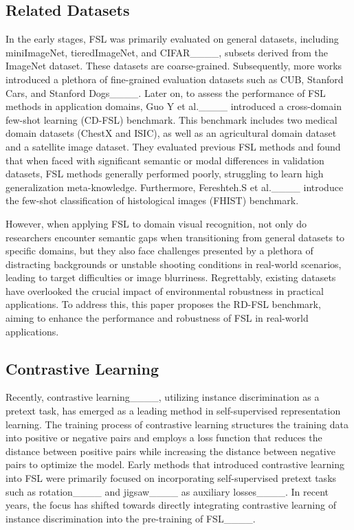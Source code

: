 \subsection{Related Datasets}
\label{subsec:related}
In the early stages, FSL was primarily evaluated on general datasets, including miniImageNet, tieredImageNet, and CIFAR____, subsets derived from the ImageNet dataset. These datasets are coarse-grained. Subsequently, more works introduced a plethora of fine-grained evaluation datasets such as CUB, Stanford Cars, and Stanford Dogs____. 
Later on, to assess the performance of FSL methods in application domains, Guo Y et al.____ introduced a cross-domain few-shot learning (CD-FSL) benchmark. This benchmark includes two medical domain datasets (ChestX and ISIC), as well as an agricultural domain dataset and a satellite image dataset. They evaluated previous FSL methods and found that when faced with significant semantic or modal differences in validation datasets, FSL methods generally performed poorly, struggling to learn high generalization meta-knowledge.
Furthermore, Fereshteh.S et al.____ introduce the few-shot classification of histological images (FHIST) benchmark.

However, when applying FSL to domain visual recognition, not only do researchers encounter semantic gaps when transitioning from general datasets to specific domains, but they also face challenges presented by a plethora of distracting backgrounds or unstable shooting conditions in real-world scenarios, leading to target difficulties or image blurriness.
Regrettably, existing datasets have overlooked the crucial impact of environmental robustness in practical applications. To address this, this paper proposes the RD-FSL benchmark, aiming to enhance the performance and robustness of FSL in real-world applications.

\subsection{Contrastive Learning}
\label{subsec:con}
Recently, contrastive learning____, utilizing instance discrimination as a pretext task, has emerged as a leading method in self-supervised representation learning. 
The training process of contrastive learning structures the training data into positive or negative pairs and employs a loss function that reduces the distance between positive pairs while increasing the distance between negative pairs to optimize the model. 
Early methods that introduced contrastive learning into FSL were primarily focused on incorporating self-supervised pretext tasks such as rotation____ and jigsaw____ as auxiliary losses____. In recent years, the focus has shifted towards directly integrating contrastive learning of instance discrimination into the pre-training of FSL____. 

